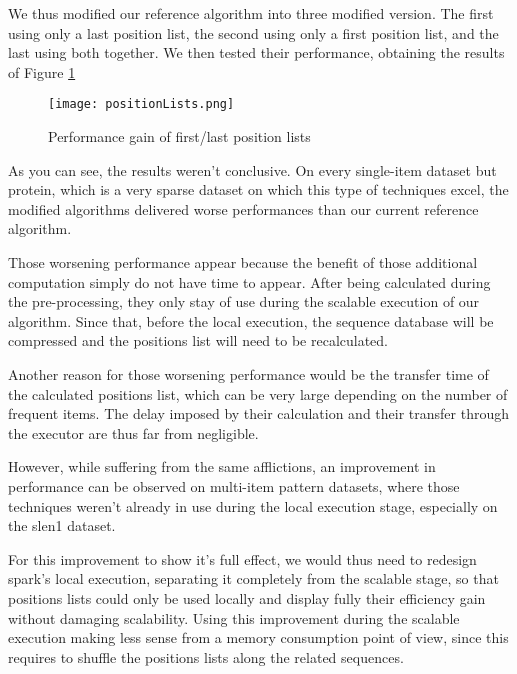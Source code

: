 \documentclass{eplmastersthesis}
\begin{document}
We thus modified our reference algorithm into three modified version. The first using only a last position list, the second using only a first position list, and the last using both together. We then tested their performance, obtaining the results of Figure \ref{fig:positionListPerf} \newline

\begin{figure}[h]
  \centering
  \texttt{[image: positionLists.png]}
  \caption{Performance gain of first/last position lists}
  \label{fig:positionListPerf}
\end{figure}

As you can see, the results weren't conclusive. On every single-item dataset but protein, which is a very sparse dataset on which this type of techniques excel, the modified algorithms delivered worse performances than our current reference algorithm. \newline

Those worsening performance appear because the benefit of those additional computation simply do not have time to appear. After being calculated during the pre-processing, they only stay of use during the scalable execution of our algorithm. Since that, before the local execution, the sequence database will be compressed and the positions list will need to be recalculated. \newline

Another reason for those worsening performance would be the transfer time of the calculated positions list, which can be very large depending on the number of frequent items. The delay imposed by their calculation and their transfer through the executor are thus far from negligible. \newline

However, while suffering from the same afflictions, an improvement in performance can be observed on multi-item pattern datasets, where those techniques weren't already in use during the local execution stage, especially on the slen1 dataset. \newline

For this improvement to show it's full effect, we would thus need to redesign spark's local execution, separating it completely from the scalable stage, so that positions lists could only be used locally and display fully their efficiency gain without damaging scalability. \newline
Using this improvement during the scalable execution making less sense from a memory consumption point of view, since this requires to shuffle the positions lists along the related sequences.
\end{document}
